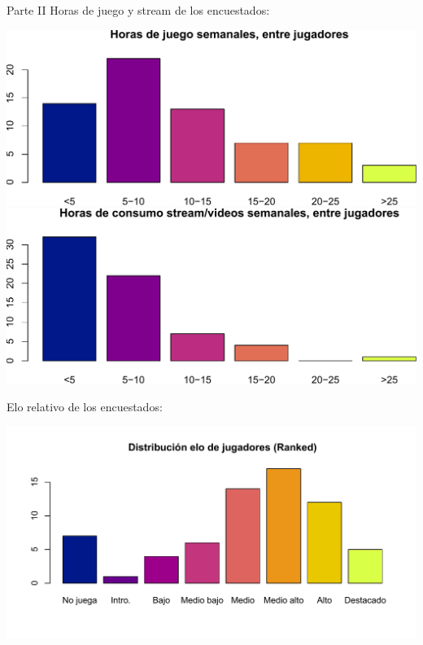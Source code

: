 \documentclass[pdf]{beamer}
\begin{document}
\begin{frame}{Parte II}
Horas de juego y stream de los encuestados:
\vspace{.4cm}

\includegraphics[trim={cm 0cm 0cm 0},width=0.45\linewidth,scale=1]{hjuego.pdf}
\includegraphics[trim={cm 0cm 0cm 0},width=0.45\linewidth,scale=1]{hstream.pdf}

Elo relativo de los encuestados:

\begin{center}
\includegraphics[trim={0.25cm cm 0.25cm cm},width=0.8\linewidth]{elo2.pdf}
\end{center}

\end{frame}
\end{document}
